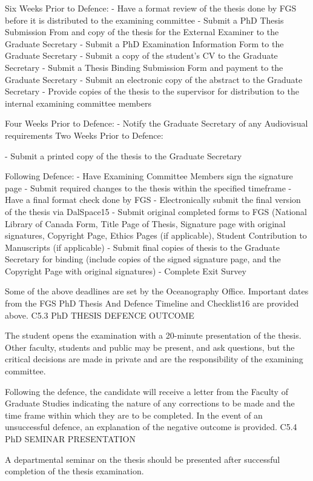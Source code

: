 Six Weeks Prior to Defence:
-	Have a format review of the thesis done by FGS before it is distributed to the examining committee
-	Submit a PhD Thesis Submission From and copy of the thesis for the External Examiner to the Graduate Secretary
-	Submit a PhD Examination Information Form to the Graduate Secretary
-	Submit a copy of the student’s CV to the Graduate Secretary
-	Submit a Thesis Binding Submission Form and payment to the Graduate Secretary
-	Submit an electronic copy of the abstract to the Graduate Secretary
-	Provide copies of the thesis to the supervisor for distribution to the internal examining committee members

Four Weeks Prior to Defence:
-	Notify the Graduate Secretary of any Audiovisual requirements Two Weeks Prior to Defence:
 

-	Submit a printed copy of the thesis to the Graduate Secretary

Following Defence:
-	Have Examining Committee Members sign the signature page
-	Submit required changes to the thesis within the specified timeframe
-	Have a final format check done by FGS
-	Electronically submit the final version of the thesis via DalSpace15
-	Submit original completed forms to FGS (National Library of Canada Form, Title Page of Thesis, Signature page with original signatures, Copyright Page, Ethics Pages (if applicable), Student Contribution to Manuscripts (if applicable)
-	Submit final copies of thesis to the Graduate Secretary for binding (include copies of the signed signature page, and the Copyright Page with original signatures)
-	Complete Exit Survey

Some of the above deadlines are set by the Oceanography Office. Important dates from the FGS PhD Thesis And Defence Timeline and Checklist16 are provided above.
C5.3	PhD THESIS DEFENCE OUTCOME

The student opens the examination with a 20-minute presentation of the thesis. Other faculty, students and public may be present, and ask questions, but the critical decisions are made in private and are the responsibility of the examining committee.

Following the defence, the candidate will receive a letter from the Faculty of Graduate Studies indicating the nature of any corrections to be made and the time frame within which they are to be completed.  In the event of an unsuccessful defence, an explanation of the negative outcome is provided.
C5.4	PhD SEMINAR PRESENTATION

A departmental seminar on the thesis should be presented after successful completion of the thesis examination.

